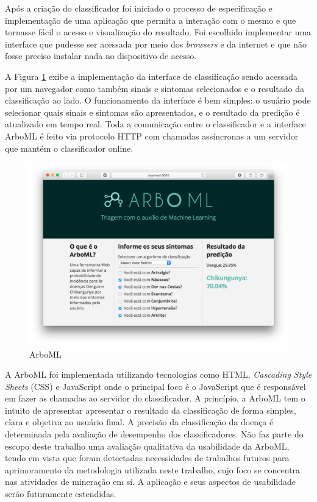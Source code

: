 Após a criação do classificador foi iniciado o processo de especificação e implementação de uma aplicação que permita a interação com o mesmo e que tornasse fácil o acesso e visualização do resultado. Foi escolhido implementar uma interface que pudesse ser acessada por meio dos \textit{browsers} e da internet e que não fosse preciso instalar nada no dispositivo de acesso.

A Figura \ref{fig:arboml} exibe a implementação da interface de classificação sendo acessada por um navegador como também sinais e sintomas selecionados e o resultado da classificação ao lado. O funcionamento da interface é bem simples: o usuário pode selecionar quais sinais e sintomas são apresentados, e o resultado da predição é atualizado em tempo real. Toda a comunicação entre o classificador e a interface ArboML é feito via protocolo HTTP com chamadas assíncronas a um servidor que mantém o classificador online.

\begin{figure}[htb]
  \caption{\label{fig:arboml}ArboML}
  \begin{center}
    \includegraphics[scale=0.46]{imagens/arboML.png}
  \end{center}
\end{figure}
\newpage

A ArboML foi implementada utilizando tecnologias como HTML, \textit{Cascading Style Sheets} (CSS) e JavaScript onde o principal foco é o JavaScript que é responsável em fazer as chamadas ao servidor do classificador. A princípio, a ArboML tem o intuito de apresentar  apresentar o resultado da classificação de forma simples, clara e objetiva ao usuário final. A precisão da classificação da doença é determinada pela avaliação de desempenho dos classificadores. Não faz parte do escopo deste trabalho uma avaliação qualitativa da usabilidade da ArboML, tendo em vista que foram detectadas necessidades de trabalhos futuros para aprimoramento da metodologia utilizada neste trabalho, cujo foco se concentra nas atividades de mineração em si. A aplicação e seus aspectos de usabilidade serão futuramente estendidas.

